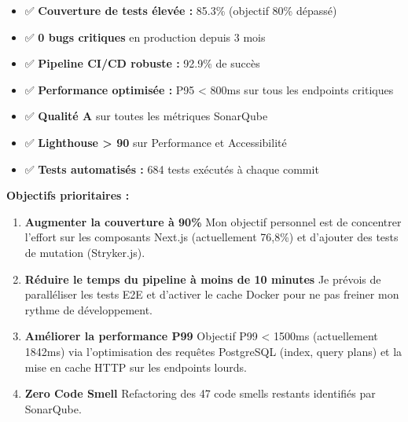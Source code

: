 \begin{tcolorbox}[colback=green!5!white,colframe=green!60!black,title=\textbf{Points forts de la stratégie qualité}]
\begin{itemize}
    \item ✅ \textbf{Couverture de tests élevée :} 85.3\% (objectif 80\% dépassé)
    \item ✅ \textbf{0 bugs critiques} en production depuis 3 mois
    \item ✅ \textbf{Pipeline CI/CD robuste :} 92.9\% de succès
    \item ✅ \textbf{Performance optimisée :} P95 < 800ms sur tous les endpoints critiques
    \item ✅ \textbf{Qualité A} sur toutes les métriques SonarQube
    \item ✅ \textbf{Lighthouse > 90} sur Performance et Accessibilité
    \item ✅ \textbf{Tests automatisés :} 684 tests exécutés à chaque commit
\end{itemize}
\end{tcolorbox}

\begin{tcolorbox}[colback=yellow!5!white,colframe=yellow!60!black,title=\textbf{Plan d'amélioration Q1 2026}]
\textbf{Objectifs prioritaires :}
\begin{enumerate}
    \item \textbf{Augmenter la couverture à 90\%}  Mon objectif personnel est de concentrer l'effort sur les composants Next.js (actuellement 76,8\%) et d'ajouter des tests de mutation (Stryker.js).
    
    \item \textbf{Réduire le temps du pipeline à moins de 10 minutes}  Je prévois de paralléliser les tests E2E et d'activer le cache Docker pour ne pas freiner mon rythme de développement.
    
    \item \textbf{Améliorer la performance P99}  Objectif P99 < 1500ms (actuellement 1842ms) via l'optimisation des requêtes PostgreSQL (index, query plans) et la mise en cache HTTP sur les endpoints lourds.
    
    \item \textbf{Zero Code Smell}  Refactoring des 47 code smells restants identifiés par SonarQube.
\end{enumerate}
\end{tcolorbox}

